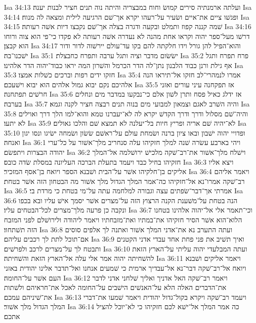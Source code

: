 Isa 34:13  ועלתה ארמנתיה סירים קמושׂ וחוח במבצריה והיתה נוה תנים חציר לבנות יענה׃
Isa 34:14  ופגשׁו ציים את־איים ושׂעיר על־רעהו יקרא אך־שׁם הרגיעה לילית ומצאה לה מנוח׃
Isa 34:15  שׁמה קננה קפוז ותמלט ובקעה ודגרה בצלה אך־שׁם נקבצו דיות אשׁה רעותה׃
Isa 34:16  דרשׁו מעל־ספר יהוה וקראו אחת מהנה לא נעדרה אשׁה רעותה לא פקדו כי־פי הוא צוה ורוחו הוא קבצן׃
Isa 34:17  והוא־הפיל להן גורל וידו חלקתה להם בקו עד־עולם יירשׁוה לדור ודור ישׁכנו־בה׃
Isa 35:1  ישׂשׂום מדבר וציה ותגל ערבה ותפרח כחבצלת׃
Isa 35:2  פרח תפרח ותגל אף גילת ורנן כבוד הלבנון נתן־לה הדר הכרמל והשׁרון המה יראו כבוד־יהוה הדר אלהינו׃
Isa 35:3  חזקו ידים רפות וברכים כשׁלות אמצו׃
Isa 35:4  אמרו לנמהרי־לב חזקו אל־תיראו הנה אלהיכם נקם יבוא גמול אלהים הוא יבוא וישׁעכם׃
Isa 35:5  אז תפקחנה עיני עורים ואזני חרשׁים תפתחנה׃
Isa 35:6  אז ידלג כאיל פסח ותרן לשׁון אלם כי־נבקעו במדבר מים ונחלים בערבה׃
Isa 35:7  והיה השׁרב לאגם וצמאון למבועי מים בנוה תנים רבצה חציר לקנה וגמא׃
Isa 35:8  והיה־שׁם מסלול ודרך ודרך הקדשׁ יקרא לה לא־יעברנו טמא והוא־למו הלך דרך ואוילים לא יתעו׃
Isa 35:9  לא־יהיה שׁם אריה ופריץ חיות בל־יעלנה לא תמצא שׁם והלכו גאולים׃
Isa 35:10  ופדויי יהוה ישׁבון ובאו ציון ברנה ושׂמחת עולם על־ראשׁם שׂשׂון ושׂמחה ישׂיגו ונסו יגון ואנחה׃
Isa 36:1  ויהי בארבע עשׂרה שׁנה למלך חזקיהו עלה סנחריב מלך־אשׁור על כל־ערי יהודה הבצרות ויתפשׂם׃
Isa 36:2  וישׁלח מלך־אשׁור את־רב־שׁקה מלכישׁ ירושׁלמה אל־המלך חזקיהו בחיל כבד ויעמד בתעלת הברכה העליונה במסלת שׂדה כובס׃
Isa 36:3  ויצא אליו אליקים בן־חלקיהו אשׁר על־הבית ושׁבנא הספר ויואח בן־אסף המזכיר׃
Isa 36:4  ויאמר אליהם רב־שׁקה אמרו־נא אל־חזקיהו כה־אמר המלך הגדול מלך אשׁור מה הבטחון הזה אשׁר בטחת׃
Isa 36:5  אמרתי אך־דבר־שׂפתים עצה וגבורה למלחמה עתה על־מי בטחת כי מרדת בי׃
Isa 36:6  הנה בטחת על־משׁענת הקנה הרצוץ הזה על־מצרים אשׁר יסמך אישׁ עליו ובא בכפו ונקבה כן פרעה מלך־מצרים לכל־הבטחים עליו׃
Isa 36:7  וכי־תאמר אלי אל־יהוה אלהינו בטחנו הלוא־הוא אשׁר הסיר חזקיהו את־במתיו ואת־מזבחתיו ויאמר ליהודה ולירושׁלם לפני המזבח הזה תשׁתחוו׃
Isa 36:8  ועתה התערב נא את־אדני המלך אשׁור ואתנה לך אלפים סוסים אם־תוכל לתת לך רכבים עליהם׃
Isa 36:9  ואיך תשׁיב את פני פחת אחד עבדי אדני הקטנים ותבטח לך על־מצרים לרכב ולפרשׁים׃
Isa 36:10  ועתה המבלעדי יהוה עליתי על־הארץ הזאת להשׁחיתה יהוה אמר אלי עלה אל־הארץ הזאת והשׁחיתה׃
Isa 36:11  ויאמר אליקים ושׁבנא ויואח אל־רב־שׁקה דבר־נא אל־עבדיך ארמית כי שׁמעים אנחנו ואל־תדבר אלינו יהודית באזני העם אשׁר על־החומה׃
Isa 36:12  ויאמר רב־שׁקה האל אדניך ואליך שׁלחני אדני לדבר את־הדברים האלה הלא על־האנשׁים הישׁבים על־החומה לאכל את־חראיהם ולשׁתות את־שׁיניהם עמכם׃
Isa 36:13  ויעמד רב־שׁקה ויקרא בקול־גדול יהודית ויאמר שׁמעו את־דברי המלך הגדול מלך אשׁור׃
Isa 36:14  כה אמר המלך אל־ישׁא לכם חזקיהו כי לא־יוכל להציל אתכם׃

